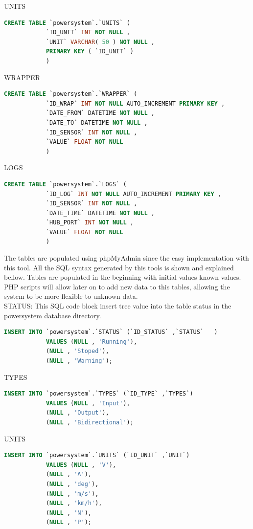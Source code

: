 		UNITS
		\begin{lstlisting}[language=sql, stepnumber=0, tabsize=1]
			CREATE TABLE `powersystem`.`UNITS` (
			`ID_UNIT` INT NOT NULL ,
			`UNIT` VARCHAR( 50 ) NOT NULL ,
			PRIMARY KEY ( `ID_UNIT` )
			)
		\end{lstlisting}
		WRAPPER
		\begin{lstlisting}[language=sql, stepnumber=0, tabsize=1]
			CREATE TABLE `powersystem`.`WRAPPER` (
			`ID_WRAP` INT NOT NULL AUTO_INCREMENT PRIMARY KEY ,
			`DATE_FROM` DATETIME NOT NULL ,
			`DATE_TO` DATETIME NOT NULL ,
			`ID_SENSOR` INT NOT NULL ,
			`VALUE` FLOAT NOT NULL
			)
		\end{lstlisting}
		LOGS
		\begin{lstlisting}[language=sql, stepnumber=0, tabsize=1]
			CREATE TABLE `powersystem`.`LOGS` (
			`ID_LOG` INT NOT NULL AUTO_INCREMENT PRIMARY KEY ,
			`ID_SENSOR` INT NOT NULL ,
			`DATE_TIME` DATETIME NOT NULL ,
			`HUB_PORT` INT NOT NULL ,
			`VALUE` FLOAT NOT NULL
			)
		\end{lstlisting}
	
The tables are populated using phpMyAdmin since the easy implementation with this tool. All the SQL syntax generated by this tools is shown and explained bellow.
Tables are populated in the beginning with initial values known values. PHP scripts will allow later on to add new data to this tables, allowing the system to be more flexible to unknown data.\\
		STATUS:
		This SQL code block insert tree value into the table status in the powersystem database directory.
		\begin{lstlisting}[language=sql, stepnumber=0, tabsize=1]
			INSERT INTO `powersystem`.`STATUS` (`ID_STATUS` ,`STATUS`	)
			VALUES (NULL , 'Running'),
			(NULL , 'Stoped'),
			(NULL , 'Warning');
		\end{lstlisting}
		TYPES
		\begin{lstlisting}[language=sql, stepnumber=0, tabsize=1]
			INSERT INTO `powersystem`.`TYPES` (`ID_TYPE` ,`TYPES`)
			VALUES (NULL , 'Input'), 
			(NULL , 'Output'),
			(NULL , 'Bidirectional');
		\end{lstlisting}
		UNITS
		\begin{lstlisting}[language=sql, stepnumber=0, tabsize=1]
			INSERT INTO `powersystem`.`UNITS` (`ID_UNIT` ,`UNIT`)
			VALUES (NULL , 'V'),
			(NULL , 'A'),
			(NULL , 'deg'), 
			(NULL , 'm/s'), 
			(NULL , 'km/h'), 
			(NULL , 'N'), 
			(NULL , 'P');
		\end{lstlisting}		


